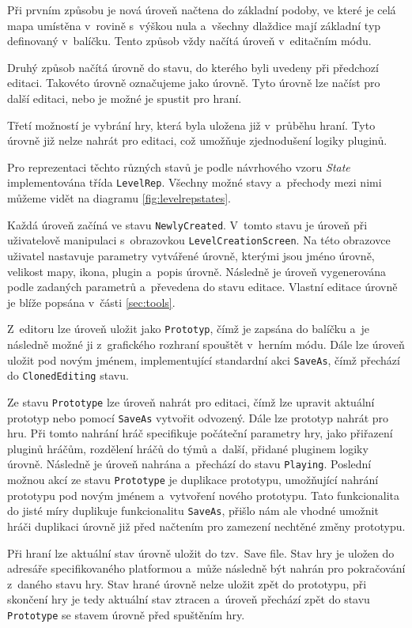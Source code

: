 Při prvním způsobu je nová úroveň načtena do základní podoby, ve které je celá mapa umístěna v~rovině s~výškou nula a~všechny dlaždice mají základní typ definovaný v~balíčku. Tento způsob vždy načítá úroveň v~editačním módu.

Druhý způsob načítá úrovně do stavu, do kterého byli uvedeny při předchozí editaci. Takovéto úrovně označujeme jako  úrovně. Tyto úrovně lze načíst pro další editaci, nebo je možné je spustit pro hraní.

Třetí možností je vybrání hry, která byla uložena již v~průběhu hraní. Tyto úrovně již nelze nahrát pro editaci, což umožňuje zjednodušení logiky pluginů. 

Pro reprezentaci těchto různých stavů je podle návrhového vzoru \textit{State} \citep[str.~305]{book:gangoffour} implementována třída \texttt{LevelRep}. Všechny možné stavy a~přechody mezi nimi můžeme vidět na diagramu \ref{fig:levelrepstates}. 

Každá úroveň začíná ve stavu \texttt{NewlyCreated}. V~tomto stavu je úroveň při uživatelově manipulaci s~obrazovkou \texttt{LevelCreationScreen}. Na této obrazovce uživatel nastavuje parametry vytvářené úrovně, kterými jsou jméno úrovně, velikost mapy, ikona, plugin a~popis úrovně. Následně je úroveň vygenerována podle zadaných parametrů a~převedena do stavu editace. Vlastní editace úrovně je blíže popsána v~části \ref{sec:tools}. 

Z~editoru lze úroveň uložit jako \texttt{Prototyp}, čímž je zapsána do balíčku a~je následně možné ji z~grafického rozhraní spouštět v~herním módu. Dále lze úroveň uložit pod novým jménem, implementující standardní akci \texttt{SaveAs}, čímž přechází do \texttt{ClonedEditing} stavu. 

Ze stavu \texttt{Prototype} lze úroveň nahrát pro editaci, čímž lze upravit aktuální prototyp nebo pomocí \texttt{SaveAs} vytvořit odvozený. Dále lze prototyp nahrát pro hru. Při tomto nahrání hráč specifikuje počáteční parametry hry, jako přiřazení pluginů hráčům, rozdělení hráčů do týmů a~další, přidané pluginem logiky úrovně. Následně je úroveň nahrána a~přechází do stavu \texttt{Playing}. Poslední možnou akcí ze stavu \texttt{Prototype} je duplikace prototypu, umožňující nahrání prototypu pod novým jménem a~vytvoření nového prototypu. Tato funkcionalita do jisté míry duplikuje funkcionalitu \texttt{SaveAs}, přišlo nám ale vhodné umožnit hráči duplikaci úrovně již před načtením pro zamezení nechtěné změny prototypu.

Při hraní lze aktuální stav úrovně uložit do tzv.~Save file. Stav hry je uložen do adresáře specifikovaného platformou a~může následně být nahrán pro pokračování z~daného stavu hry. Stav hrané úrovně nelze uložit zpět do prototypu, při skončení hry je tedy aktuální stav ztracen a~úroveň přechází zpět do stavu \texttt{Prototype} se stavem úrovně před spuštěním hry.

